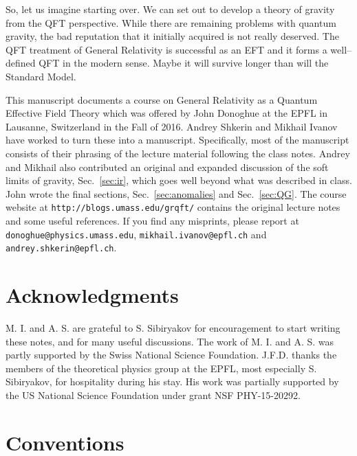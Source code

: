 \documentclass[12pt]{article}
\begin{document}
So, let us imagine starting over. We can set out to develop a theory of gravity from the QFT perspective. While there are remaining problems with quantum gravity, the bad reputation that it initially acquired is not really deserved. The QFT treatment of General Relativity is successful as an EFT and it forms a well--defined QFT in the modern sense. Maybe it will survive longer than will the Standard Model.

This manuscript documents a course on General Relativity as a Quantum Effective Field Theory which was offered by John Donoghue at the EPFL in Lausanne, Switzerland in the Fall of 2016.  Andrey Shkerin and Mikhail Ivanov have worked to turn these into a manuscript. Specifically, most of the manuscript consists of their phrasing of the lecture material following the class notes. Andrey and Mikhail also contributed an original and expanded discussion of the soft limits of gravity,
Sec.~\ref{sec:ir}, which goes well beyond what was described in class.
John wrote the final sections, Sec.~\ref{sec:anomalies} and Sec.~\ref{sec:QG}.
The course website at \texttt{http://blogs.umass.edu/grqft/} contains the original lecture notes and some useful references.
If you find any misprints, please report at \texttt{donoghue@physics.umass.edu}, \newline
\texttt{mikhail.ivanov@epfl.ch} and  \texttt{andrey.shkerin@epfl.ch}.


\section*{Acknowledgments}

M. I. and A. S. are grateful to S. Sibiryakov for encouragement to start writing these notes, and for many useful discussions.
The work of M. I. and A. S. was partly supported by the Swiss National Science Foundation. 
J.F.D. thanks the members of the theoretical physics group at the EPFL, most especially S. Sibiryakov, for hospitality during his stay. His work was partially supported by the US National Science Foundation under grant NSF PHY-15-20292.

\section*{Conventions}
\end{document}
